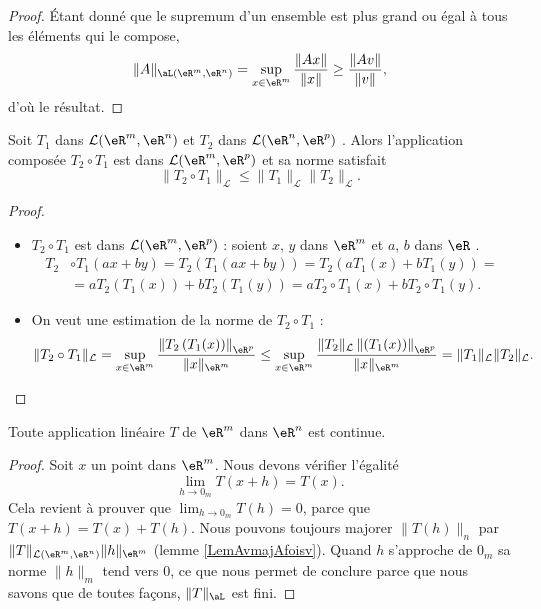 \begin{proof}
	Étant donné que le supremum d'un ensemble est plus grand ou égal à tous les éléments qui le compose,
	\begin{equation}
		\| A \|_{\aL(\eR^m,\eR^n)}=\sup_{x\in\eR^m}\frac{ \| Ax \| }{ \| x \| }\geq\frac{ \| Av \| }{ \| v \| },
	\end{equation}
	d'où le résultat.
\end{proof}

\begin{proposition}
  Soit $T_1$ dans $\mathcal{L}(\eR^m, \eR^n)$ et $T_2$ dans $\mathcal{L}(\eR^n, \eR^p)$ . Alors l'application composée $T_2\circ T_1 $ est dans $\mathcal{L}(\eR^m, \eR^p)$ et sa norme satisfait
  \begin{equation}  \label{EqFwTvwI}
\|T_2\circ T_1 \|_{\mathcal{L}}\leq\|T_1\|_{\mathcal{L}} \|T_2\|_{\mathcal{L}}.
  \end{equation}
\end{proposition}
\begin{proof}
  \begin{itemize}
  \item $T_2\circ T_1 $ est dans $\mathcal{L}(\eR^m, \eR^p)$ : soient $x,\, y$ dans $\eR^m$ et $a,\, b$ dans $\eR$ . 
    \begin{equation}\nonumber
      \begin{aligned}
       T_2&\circ T_1 (ax+by)= T_2\left(T_1(ax+by)\right)=T_2(aT_1(x)+bT_1(y))=\\
&= aT_2\left(T_1(x)\right)+ bT_2\left(T_1(y)\right) = aT_2\circ T_1(x)+ bT_2\circ T_1(y). 
      \end{aligned}
    \end{equation}  
\item
	On veut une estimation de la norme de $T_2\circ T_1 $ :
\[
\|T_2\circ T_1 \|_{\mathcal{L}}= \sup_{x\in\eR^m}\frac{\left\|T_2\left(T_1(x)\right)\right\|_{\eR^p}}{\|x\|_{\eR^m}}\leq  \sup_{x\in\eR^m}\frac{\|T_2\|_{\mathcal{L}}\left\|\left(T_1(x)\right)\right\|_{\eR^p}}{\|x\|_{\eR^m}} =\|T_1\|_{\mathcal{L}} \|T_2\|_{\mathcal{L}}.
\]
  \end{itemize}
\end{proof}

\begin{proposition}
  Toute application linéaire $T$ de $\eR^m$ dans $\eR^n$ est continue. 
\end{proposition}
\begin{proof}
  Soit $x$ un point dans $\eR^m$. Nous devons vérifier l'égalité
\[
\lim_{h\to 0_m}T(x+h)=T(x).
\]
Cela revient à prouver que $\lim_{h\to 0_m}T(h)=0$, parce que $T(x+h)=T(x)+T(h)$. Nous pouvons toujours majorer $\|T(h)\|_n$ par $\|T\|_{\mathcal{L}(\eR^m,\eR^n)}\| h \|_{\eR^m}$ (lemme \ref{LemAvmajAfoisv}). Quand $h$ s'approche de $ 0_m $ sa norme $\|h\|_m$ tend vers $0$, ce que nous permet de conclure parce que nous savons que de toutes façons, $\| T \|_{\aL}$ est fini.
\end{proof}
